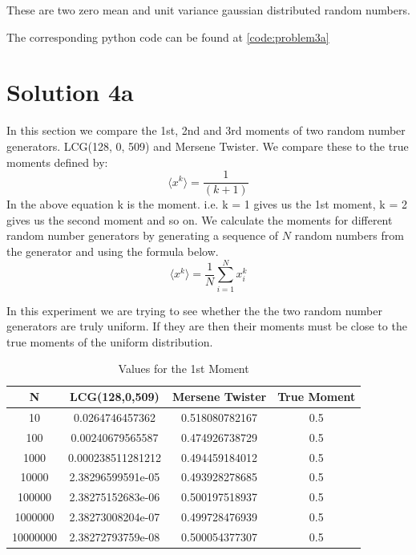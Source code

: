 \documentclass[a4paper,11pt]{article}
\begin{document}
These are two zero mean and unit variance gaussian distributed random numbers.

The corresponding python code can be found at \ref{code:problem3a}
\section{Solution 4a}\label{prob4a}

In this section we compare the 1st, 2nd and 3rd moments of two random number generators. LCG(128, 0, 509) and Mersene Twister. We compare these to the true moments defined by:
\begin{equation}
    \langle x^{k} \rangle = \frac{1}{(k+1)}
\end{equation}
In the above equation k is the moment. i.e. k = 1 gives us the 1st moment, k = 2 gives us the second moment and so on.
We calculate the moments for different random number generators by generating a sequence of $N$ random numbers from the generator and using the formula below. 
\begin{equation}
    \langle x^k \rangle = \frac{1}{N}\sum_{i=1}^{N}x_{i}^{k}
\end{equation}

In this experiment we are trying to see whether the the two random number generators are truly uniform. If they are then their moments must be close to the true moments of the uniform distribution.

\begin{table}[ht]
\centering
\label{1moment}
\begin{tabular}{|c|c|c|c|}
\hline
\textbf{N} & \textbf{LCG(128,0,509)}&\textbf{Mersene Twister}&\textbf{True Moment} \\ \hline
10 & 0.0264746457362 & 0.518080782167 & 0.5 \\
100 & 0.00240679565587 & 0.474926738729 & 0.5 \\
1000 & 0.000238511281212 & 0.494459184012 & 0.5 \\
10000 & 2.38296599591e-05 & 0.493928278685 & 0.5 \\
100000 & 2.38275152683e-06 & 0.500197518937 & 0.5 \\
1000000 & 2.38273008204e-07 & 0.499728476939 & 0.5 \\
10000000 & 2.38272793759e-08 & 0.500054377307 & 0.5 \\
\hline
\end{tabular}
\caption{Values for the 1st Moment}
\end{table}
\end{document}

